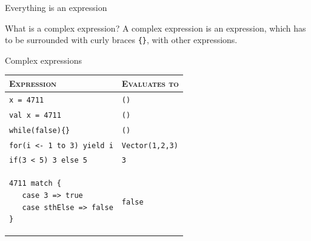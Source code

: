 \begin{frame}[fragile]{Everything is an expression}
\begin{block}{What is a complex expression?}
A complex expression is an expression, which has to be surrounded with curly
braces \lstinline!{}!,  with other expressions.
\end{block}
\begin{exampleblock}{Complex expressions}
\begin{center}
\begin{tabular}{l|l}
\hline
\textsc{Expression} & \textsc{Evaluates to}\\
\hline
\lstinline!x = 4711! & \lstinline!()!\\
\hline
\lstinline!val x = 4711! & \lstinline!()!\\
\hline
\lstinline!while(false){}! & \lstinline!()!\\
\hline
\lstinline!for(i <- 1 to 3) yield i! & \lstinline!Vector(1,2,3)!\\
\hline
\lstinline!if(3 < 5) 3 else 5! & \lstinline!3!\\
\hline
\begin{lstlisting}
4711 match {
   case 3 => true
   case sthElse => false
}
\end{lstlisting} & \lstinline!false!\\
\hline
\end{tabular}
\end{center}
\end{exampleblock}
\end{frame}

